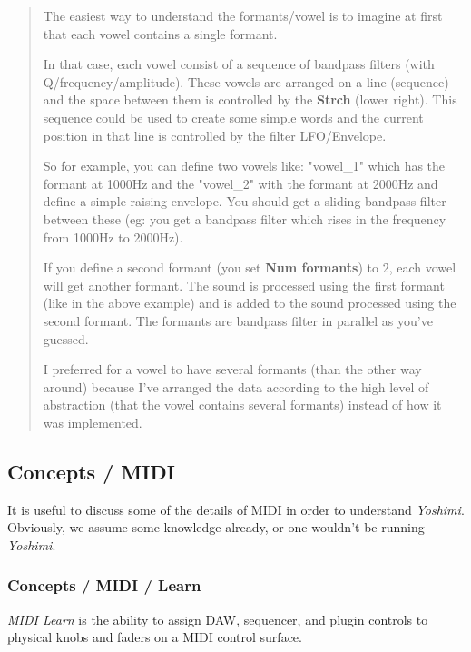    \begin{quotation}
      The easiest way to understand the formants/vowel is to imagine at first
      that each vowel contains a single formant.

      In that case, each vowel consist of a sequence of bandpass filters (with
      Q/frequency/amplitude). These vowels are arranged on a line (sequence) and
      the space between them is controlled by the \textbf{Strch} (lower right).
      This sequence could be used to create some simple words and the current
      position in that line is controlled by the filter LFO/Envelope.

      So for example, you can define two vowels like: "vowel\_1" which has the
      formant at 1000Hz and the "vowel\_2" with the formant at 2000Hz and define
      a simple raising envelope. You should get a sliding bandpass filter between
      these (eg: you get a bandpass filter which rises in the frequency from
      1000Hz to 2000Hz).

      If you define a second formant (you set \textbf{Num formants}) to 2, each
      vowel will get another formant.  The sound is processed using the first
      formant (like in the above example) and is added to the sound processed
      using the second formant. The formants are bandpass filter in parallel as
      you've guessed.

      I preferred for a vowel to have several formants (than the other way
      around) because I've arranged the data according to the high level of
      abstraction (that the vowel contains several formants) instead of how it
      was implemented.
   \end{quotation}

\subsection{Concepts / MIDI}
\label{subsec:concepts_midi}

   It is useful to discuss some of the details of MIDI in order
   to understand \textsl{Yoshimi}.  Obviously, we assume
   some knowledge already, or one wouldn't be running
   \textsl{Yoshimi}.

\subsubsection{Concepts / MIDI / Learn}
\label{subsubsec:concepts_midi_learn}

   \textsl{MIDI Learn} is
   the ability to assign DAW, sequencer, and plugin controls to physical
   knobs and faders on a MIDI control surface.

